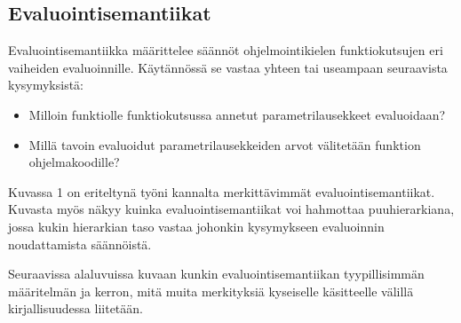\subsection{Evaluointisemantiikat}

Evaluointisemantiikka määrittelee säännöt ohjelmointikielen funktiokutsujen eri vaiheiden evaluoinnille. Käytännössä se vastaa yhteen tai useampaan seuraavista kysymyksistä:

\begin{itemize}
    \item Milloin funktiolle funktiokutsussa annetut parametrilausekkeet evaluoidaan?
    \item Millä tavoin evaluoidut parametrilausekkeiden arvot välitetään funktion ohjelmakoodille?
\end{itemize}

Kuvassa 1 on eriteltynä työni kannalta merkittävimmät evaluointisemantiikat. Kuvasta myös näkyy kuinka evaluointisemantiikat voi hahmottaa puuhierarkiana, jossa kukin hierarkian taso vastaa johonkin kysymykseen evaluoinnin noudattamista säännöistä.

Seuraavissa alaluvuissa kuvaan kunkin evaluointisemantiikan tyypillisimmän määritelmän ja kerron, mitä muita merkityksiä kyseiselle käsitteelle välillä kirjallisuudessa liitetään.

